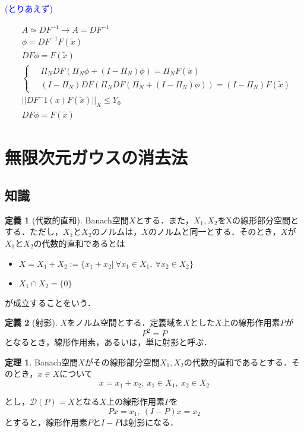 \documentclass[11pt,a4paper]{jsarticle}
\theoremstyle{definition}
\newtheorem{dfn}{定義}
\newtheorem{thm}{定理}
\begin{document}
\textcolor{blue}{(とりあえず)}

\begin{align*}
   & A \simeq DF^{-1} \rightarrow A = DF^{-1} \\
   & \phi = DF^{-1}F(\tilde{x})               \\
   & DF\phi = F(\tilde{x})                    \\
   & \left\{ \,
  \begin{aligned}
     & \Pi_N DF ( \Pi_N \phi + (I-\Pi_N) \phi ) = \Pi_N F(\tilde{x})             \\
     & (I-\Pi_N) DF (\Pi_N DF (\Pi_N + (I-\Pi_N) \phi)) = (I-\Pi_N) F(\tilde{x})
  \end{aligned}
  \right.                                     \\
   & ||DF^-1(x)F(\tilde{x})||_X \leq Y_0\\
   & DF \phi = F(\tilde{x})
\end{align*}

\section{無限次元ガウスの消去法}
\subsection{知識}

\begin{dfn}[代数的直和]
  Banach空間$X$とする．また，$X_1,X_2$をXの線形部分空間とする．ただし，$X_1$と$X_2$のノルムは，$X$のノルムと同一とする．そのとき，$X$が$X_1$と$X_2$の代数的直和であるとは
  \begin{itemize}
    \item $X=X_1+X_2:=\{x_1+x_2 | \  \forall x_1 \in X_1, \ \forall x_2 \in X_2 \}$
    \item $X_1 \cap X_2 = \{0\}$
  \end{itemize}
  が成立することをいう．
\end{dfn}

\begin{dfn}[射影]
  $X$をノルム空間とする．定義域を$X$とした$X$上の線形作用素$P$が
  \begin{equation*}
    P^2=P
  \end{equation*}
  となるとき，線形作用素，あるいは，単に射影と呼ぶ．
\end{dfn}

\begin{thm}
  Banach空間$X$がその線形部分空間$X_1,X_2$の代数的直和であるとする．そのとき，$x\in X$について
  \begin{equation*}
    x=x_1+x_2,\ x_1 \in X_1,\ x_2 \in X_2
  \end{equation*}
\end{thm}
とし，$\mathcal{D}(P)=X$となる$X$上の線形作用素$P$を
\begin{equation*}
  Px=x_1,\ (I-P)x=x_2
\end{equation*}
とすると，線形作用素$P$と$I-P$は射影になる．
\end{document}
